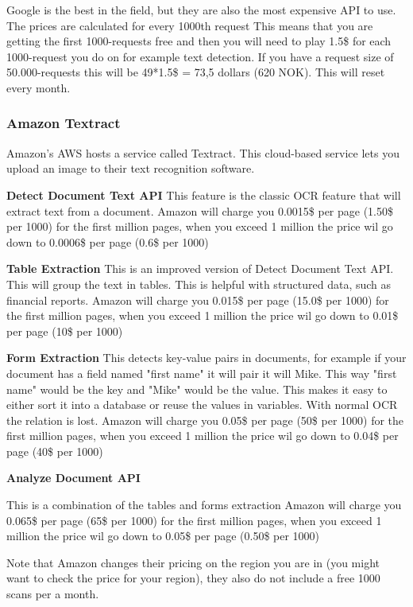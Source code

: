 Google is the best in the field, but they are also the most expensive API to use.
The prices are calculated for every 1000th request
This means that you are getting the first 1000-requests free and then you will need to play 1.5\$ for each 1000-request you do on for example text detection.
If you have a request size of 50.000-requests this will be 49*1.5\$ = 73,5 dollars (620 NOK).
This will reset every month.

\subsubsection{Amazon Textract}\label{subsubsec:API_Amazon}

Amazon's AWS hosts a service called Textract.
This cloud-based service lets you upload an image to their text recognition software.

\textbf{Detect Document Text API}
This feature is the classic OCR feature that will extract text from a document.
Amazon will charge you 0.0015\$ per page (1.50\$ per 1000) for the first million pages, when you exceed 1 million the price wil go down to
0.0006\$ per page (0.6\$ per 1000)

\textbf{Table Extraction}
This is an improved version of Detect Document Text API. This will group the text in tables.
This is helpful with structured data, such as financial reports.
Amazon will charge you 0.015\$ per page (15.0\$ per 1000) for the first million pages, when you exceed 1 million the price wil go down to
0.01\$ per page (10\$ per 1000)

\textbf{Form Extraction}
This detects key-value pairs in documents, for example if your document has a field named "first name" it will pair it will Mike.
This way "first name" would be the key and "Mike" would be the value.
This makes it easy to either sort it into a database or reuse the values in variables.
With normal OCR the relation is lost.
Amazon will charge you 0.05\$ per page (50\$ per 1000) for the first million pages, when you exceed 1 million the price wil go down to
0.04\$ per page (40\$ per 1000)

\textbf{Analyze Document API}

This is a combination of the tables and forms extraction
Amazon will charge you 0.065\$ per page (65\$ per 1000) for the first million pages, when you exceed 1 million the price wil go down to
0.05\$ per page (0.50\$ per 1000)

Note that Amazon changes their pricing on the region you are in (you might want to check the price for your region), they also do not include a free 1000 scans per a month.

